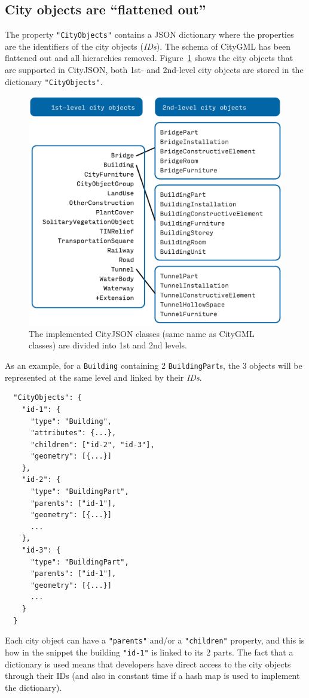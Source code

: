 \subsection{City objects are ``flattened out''}

The property \texttt{"CityObjects"} contains a JSON dictionary where the properties are the identifiers of the city objects (\emph{IDs}).
The schema of CityGML has been flattened out and all hierarchies removed.
Figure~\ref{fig:cityjson_co} shows the city objects that are supported in CityJSON, both 1st- and 2nd-level city objects are stored in the dictionary \texttt{"CityObjects"}.
\begin{figure}
  \centering
  \includegraphics[width=0.7\linewidth]{figs/cityjson_co}
  \caption{The implemented CityJSON classes (same name as CityGML classes) are divided into 1st and 2nd levels.}%
\label{fig:cityjson_co}
\end{figure}

%

As an example, for a \texttt{Building} containing 2 \texttt{BuildingPart}s, the 3 objects will be represented at the same level and linked by their \emph{IDs}.
\begin{lstlisting}
  "CityObjects": {
    "id-1": {
      "type": "Building",
      "attributes": {...},
      "children": ["id-2", "id-3"],
      "geometry": [{...}]
    },
    "id-2": {
      "type": "BuildingPart",
      "parents": ["id-1"],
      "geometry": [{...}]
      ...
    },
    "id-3": {
      "type": "BuildingPart",
      "parents": ["id-1"],
      "geometry": [{...}]
      ...
    }
  }
\end{lstlisting}

%

Each city object can have a \texttt{"parents"} and/or a \texttt{"children"} property, and this is how in the snippet the building \texttt{"id-1"} is linked to its 2 parts.
The fact that a dictionary is used means that developers have direct access to the city objects through their IDs (and also in constant time if a hash map is used to implement the dictionary).

